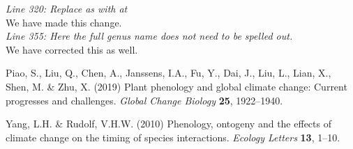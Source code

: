 \documentclass[12 pt]{article}
\begin{document}
\noindent \emph{Line 320: Replace as with at}\\

\noindent We have made this change.\\

\noindent \emph{Line 355: Here the full genus name does not need to be spelled out.}\\

\noindent We have corrected this as well.\\


\begin{thebibliography}{61}
\providecommand{\natexlab}[1]{#1}

Piao, S., Liu, Q., Chen, A., Janssens, I.A., Fu, Y., Dai, J., Liu, L., Lian,
  X., Shen, M. \& Zhu, X. (2019) Plant phenology and global climate change:
  Current progresses and challenges. \emph{Global Change Biology} \textbf{25},
  1922--1940.

Yang, L.H. \& Rudolf, V.H.W. (2010) Phenology, ontogeny and the effects of
  climate change on the timing of species interactions. \emph{Ecology Letters}
  \textbf{13}, 1--10.


\end{thebibliography}
\end{document}
